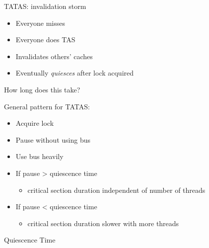 \begin{frame}[fragile]{TATAS: invalidation storm}

\begin{itemize}
  \item Everyone misses
  \pause
  \item Everyone does TAS
  \pause
  \item Invalidates others’ caches
  \pause
  \item Eventually \textit{quiesces} after lock acquired
\end{itemize}

\pause
How long does this take?  

\pause

General pattern for TATAS:
\begin{itemize}  
  \pause
  \item Acquire lock
  \pause
  \item Pause without using bus
  \pause
  \item Use bus heavily
\end{itemize}

\pause
\begin{itemize}  
  \item If pause > quiescence time
  \begin{itemize}
    \item critical section duration independent of number of threads
  \end{itemize}

  \pause
  \item If pause < quiescence time
  \begin{itemize}
    \item critical section duration slower with more threads
  \end{itemize}
\end{itemize}

\end{frame}

\begin{frame}[fragile]{Quiescence Time}


\end{frame}


